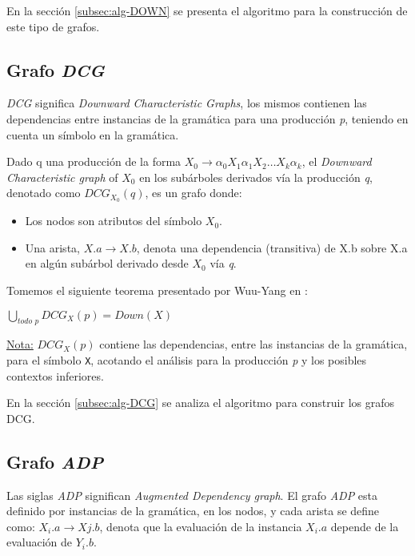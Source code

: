En la sección \ref{subsec:alg-DOWN} se presenta el algoritmo para la construcción de este tipo de grafos.

\subsection{Grafo \textit{DCG}}
\label{subsec:graph-dcg-def}
\textit{DCG} significa \textit{Downward Characteristic Graphs}, los mismos contienen las dependencias entre instancias de la gramática para una producción \textit{p}, teniendo en cuenta un símbolo en la gramática.
\begin{definition}
Dado q una producción de la forma $X_{0}\rightarrow \alpha_{0} X_{1} \alpha_{1} X_{2} \dots X_{k} \alpha_{k}$, el \textit{Downward Characteristic graph} of $X_{0}$ en los subárboles derivados vía la producción \textit{q}, denotado como $DCG_{X_{0}}(q)$, es un grafo donde: 
\begin{itemize}
\item Los nodos son atributos del símbolo $X_{0}$.
\item Una arista, $X.a \rightarrow X.b$, denota una dependencia (transitiva) de X.b sobre X.a en algún subárbol derivado desde $X_{0}$ vía \textit{q}.
\end{itemize}
\end{definition}
Tomemos el siguiente teorema presentado por Wuu-Yang en \cite{wuu-yang1}:
\begin{theorem}
$\bigcup\limits_{\textit{todo p}}{DCG_{X} (p) = Down (X)}$
\end{theorem}
\underline{Nota:} $DCG_{X}(p)$ contiene las dependencias, entre las instancias de la gramática, para el símbolo \texttt{X}, acotando el análisis para la producción \textit{p} y los posibles contextos inferiores.

En la sección \ref{subsec:alg-DCG} se analiza el algoritmo para construir los grafos DCG.

\subsection{Grafo \textit{ADP}}
\label{mag:adpdef}

Las siglas \textit{ADP} significan \textit{Augmented Dependency graph}. El grafo \textit{ADP} esta definido por instancias de la gramática, en los nodos, y cada arista se define como: $X_{i}.a\rightarrow X{j}.b$, denota que la evaluación de la instancia \textit{$X_{i}.a$} depende de la evaluación de \textit{$Y_{i}.b$}.

